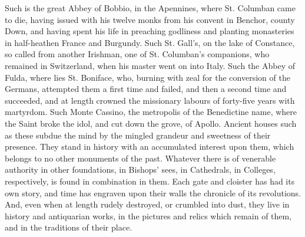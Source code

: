Such is the great Abbey of Bobbio, in the Apennines, where St.
Columban came to die, having issued with his twelve monks from his
convent in Benchor, county Down, and having spent his life in
preaching godliness and planting monasteries in half-heathen France
and Burgundy. Such St. Gall's, on the lake of Constance, so called
from another Irishman, one of St. Columban's companions, who remained
in Switzerland, when his master went on into Italy. Such the Abbey of
Fulda, where lies St. Boniface, who, burning with zeal for the
conversion of the Germans, attempted them a first time and failed, and
then a second time and succeeded, and at length crowned the missionary
labours of forty-five years with martyrdom. Such Monte Cassino, the
metropolis of the Benedictine name, where the Saint broke the idol,
and cut down the grove, of Apollo. Ancient houses such as these subdue
the mind by the mingled grandeur and sweetness of their presence. They
stand in history with an accumulated interest upon them, which belongs
to no other monuments of the past. Whatever there is of
venerable authority in other foundations, in Bishops' sees, in
Cathedrals, in Colleges, respectively, is found in combination in
them. Each gate and cloister has had its own story, and time has
engraven upon their walls the chronicle of its revolutions. And, even
when at length rudely destroyed, or crumbled into dust, they live in
history and antiquarian works, in the pictures and relics which remain
of them, and in the traditions of their place.

